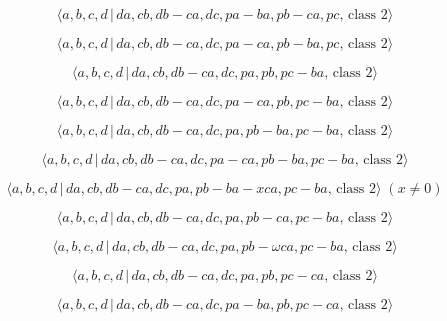 \documentclass[10pt]{article}
\begin{document}
\begin{equation}
\langle a,b,c,d\,|\,da,cb,db-ca,dc,pa-ba,pb-ca,pc,\,\text{class }2\rangle 
\tag{7.3036}
\end{equation}

\begin{equation}
\langle a,b,c,d\,|\,da,cb,db-ca,dc,pa-ca,pb-ba,pc,\,\text{class }2\rangle 
\tag{7.3037}
\end{equation}

\begin{equation}
\langle a,b,c,d\,|\,da,cb,db-ca,dc,pa,pb,pc-ba,\,\text{class }2\rangle 
\tag{7.3038}
\end{equation}

\begin{equation}
\langle a,b,c,d\,|\,da,cb,db-ca,dc,pa-ca,pb,pc-ba,\,\text{class }2\rangle 
\tag{7.3039}
\end{equation}

\begin{equation}
\langle a,b,c,d\,|\,da,cb,db-ca,dc,pa,pb-ba,pc-ba,\,\text{class }2\rangle 
\tag{7.3040}
\end{equation}

\begin{equation}
\langle a,b,c,d\,|\,da,cb,db-ca,dc,pa-ca,pb-ba,pc-ba,\,\text{class }2\rangle
\tag{7.3041}
\end{equation}

\begin{equation}
\langle a,b,c,d\,|\,da,cb,db-ca,dc,pa,pb-ba-xca,pc-ba,\,\text{class }%
2\rangle \;(x \neq 0)  \tag{7.3042}
\end{equation}

\begin{equation}
\langle a,b,c,d\,|\,da,cb,db-ca,dc,pa,pb-ca,pc-ba,\,\text{class }2\rangle 
\tag{7.3043}
\end{equation}

\begin{equation}
\langle a,b,c,d\,|\,da,cb,db-ca,dc,pa,pb-\omega ca,pc-ba,\,\text{class }%
2\rangle  \tag{7.3044}
\end{equation}

\begin{equation}
\langle a,b,c,d\,|\,da,cb,db-ca,dc,pa,pb,pc-ca,\,\text{class }2\rangle 
\tag{7.3045}
\end{equation}

\begin{equation}
\langle a,b,c,d\,|\,da,cb,db-ca,dc,pa-ba,pb,pc-ca,\,\text{class }2\rangle 
\tag{7.3046}
\end{equation}
\end{document}
